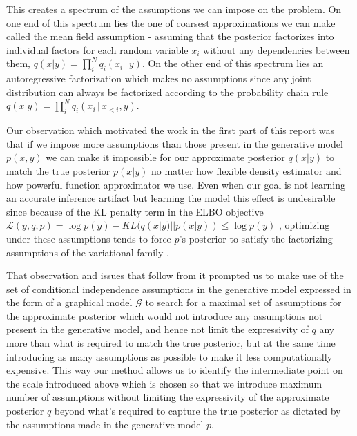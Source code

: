 \documentclass[12pt]{article}
\begin{document}
This creates a spectrum of the assumptions we can impose on the problem.
On one end of this spectrum lies the one of coarsest approximations we can make called the mean field assumption - assuming that the posterior factorizes into individual factors for each random variable $x_i$ without any dependencies between them, $q(x|y)=\prod^N_iq_i(x_i\,|\,y)$.
On the other end of this spectrum lies an autoregressive factorization which makes no assumptions since any joint distribution can always be factorized according to the probability chain rule $q(x|y)=\prod^N_iq_i(x_i\,|\,x_{<i},y)$.

Our observation which motivated the work in the first part of this report \citep{Webb2018} was that if we impose more assumptions than those present in the generative model $p(x,y)$ we can make it impossible for our approximate posterior $q(x|y)$ to match the true posterior $p(x|y)$ no matter how flexible density estimator and how powerful function approximator we use.
Even when our goal is not learning an accurate inference artifact but learning the model this effect is undesirable
since because of the KL penalty term in the ELBO objective
$\mathcal{L}(y,q,p)=\log p(y)-KL(q(x|y) || p(x|y)) \le \log p(y)$ \citep{VAE}, 
optimizing under these assumptions tends to force $p$’s posterior to satisfy the factorizing assumptions of the variational family \citep{FIVO}.

That observation and issues that follow from it prompted us to make use of the set of conditional independence assumptions in the generative model expressed in the form of a graphical model $\mathcal{G}$ to search for a maximal set of assumptions for the approximate posterior which would not introduce any assumptions not present in the generative model, and hence not limit the expressivity of $q$ any more than what is required to match the true posterior, but at the same time introducing as many assumptions as possible to make it less computationally expensive.
This way our method allows us to identify the intermediate point on the scale introduced above which is chosen so that we introduce maximum number of assumptions without limiting the expressivity of the approximate posterior $q$ beyond what's required to capture the true posterior as dictated by the assumptions made in the generative model $p$.
\end{document}
